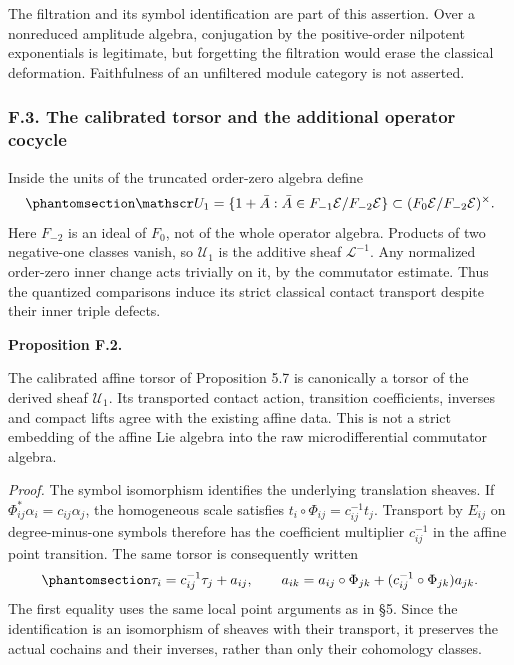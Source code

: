 \documentclass[
  english,
  11pt,
  reqno]{amsart}
\makeatletter
\newcommand{\pandocstatementheading}[1]{%
  \par\addpenalty{\@beginparpenalty}%
  \addvspace{.5\baselineskip plus .2\baselineskip minus .2\baselineskip}%
  {\normalfont\bfseries #1\par}%
  \nobreak\@afterindenttrue\@afterheading
}
\makeatother
\begin{document}
The filtration and its symbol identification are part of this assertion.
Over a nonreduced amplitude algebra, conjugation by the positive-order
nilpotent exponentials is legitimate, but forgetting the filtration
would erase the classical deformation. Faithfulness of an unfiltered
module category is not asserted.

\protect{}\label{sec:gg-op-first-units}

\subsubsection{F.3. The calibrated torsor and the additional operator
cocycle}\label{f.3.-the-calibrated-torsor-and-the-additional-operator-cocycle}

Inside the units of the truncated order-zero algebra define
\begin{equation}\protect\phantomsection\label{eq:gg-op-first-units}{
 \mathscr U_1=
 \{1+\bar A:\bar A\in F_{-1}\mathcal E/F_{-2}\mathcal E\}
       \subset(F_0\mathcal E/F_{-2}\mathcal E)^\times .
}\end{equation} Here \(F_{-2}\) is an ideal of \(F_0\), not of the whole
operator algebra. Products of two negative-one classes vanish, so
\(\mathscr U_1\) is the additive sheaf \(\mathcal L^{-1}\). Any
normalized order-zero inner change acts trivially on it, by the
commutator estimate. Thus the quantized comparisons induce its strict
classical contact transport despite their inner triple defects.

\pandocstatementheading{\protect{}\label{prop:gg-op-torsor-transport}Proposition F.2.}

The calibrated affine torsor of Proposition 5.7 is canonically a torsor
of the derived sheaf \(\mathscr U_1\). Its transported contact action,
transition coefficients, inverses and compact lifts agree with the
existing affine data. This is not a strict embedding of the affine Lie
algebra into the raw microdifferential commutator algebra.

\emph{Proof.} The symbol isomorphism identifies the underlying
translation sheaves. If \(\Phi_{ij}^*\alpha_i=c_{ij}\alpha_j\), the
homogeneous scale satisfies \(t_i\circ\Phi_{ij}=c_{ij}^{-1}t_j\).
Transport by \(E_{ij}\) on degree-minus-one symbols therefore has the
coefficient multiplier \(c_{ij}^{-1}\) in the affine point transition.
The same torsor is consequently written
\begin{equation}\protect\phantomsection\label{eq:gg-op-affine-transport}{
 \tau_i=c_{ij}^{-1}\tau_j+a_{ij},\qquad
 a_{ik}=a_{ij}\circ\Phi_{jk}
            +(c_{ij}^{-1}\circ\Phi_{jk})a_{jk}.
}\end{equation} The first equality uses the same local point arguments
as in §5. Since the identification is an isomorphism of sheaves with
their transport, it preserves the actual cochains and their inverses,
rather than only their cohomology classes.
\end{document}

